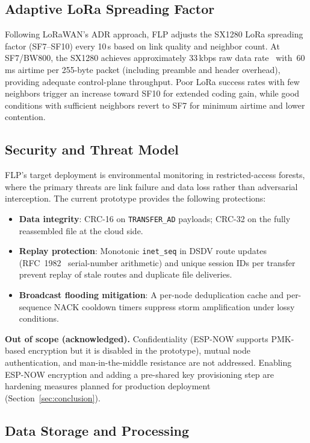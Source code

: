 \documentclass[conference]{IEEEtran}
\begin{document}
\subsection{Adaptive LoRa Spreading Factor}

Following LoRaWAN's ADR approach, FLP adjusts the SX1280 LoRa spreading factor (SF7--SF10) every 10\,s based on link quality and neighbor count. At SF7/BW800, the SX1280 achieves approximately 33\,kbps raw data rate~\cite{semtech2020sx1280} with~60\,ms airtime per 255-byte packet (including preamble and header overhead), providing adequate control-plane throughput. Poor LoRa success rates with few neighbors trigger an increase toward SF10 for extended coding gain, while good conditions with sufficient neighbors revert to SF7 for minimum airtime and lower contention.

\subsection{Security and Threat Model}

FLP's target deployment is environmental monitoring in restricted-access forests, where the primary threats are link failure and data loss rather than adversarial interception. The current prototype provides the following protections:

\begin{itemize}
  \item \textbf{Data integrity}: CRC-16 on \texttt{TRANSFER\_AD} payloads; CRC-32 on the fully reassembled file at the cloud side.
  \item \textbf{Replay protection}: Monotonic \texttt{inet\_seq} in DSDV route updates (RFC~1982~\cite{rfc1982} serial-number arithmetic) and unique session IDs per transfer prevent replay of stale routes and duplicate file deliveries.
  \item \textbf{Broadcast flooding mitigation}: A per-node deduplication cache and per-sequence NACK cooldown timers suppress storm amplification under lossy conditions.
\end{itemize}

\textbf{Out of scope (acknowledged).} Confidentiality (ESP-NOW supports PMK-based encryption but it is disabled in the prototype), mutual node authentication, and man-in-the-middle resistance are not addressed. Enabling ESP-NOW encryption and adding a pre-shared key provisioning step are hardening measures planned for production deployment (Section~\ref{sec:conclusion}).

\subsection{Data Storage and Processing}
\end{document}
